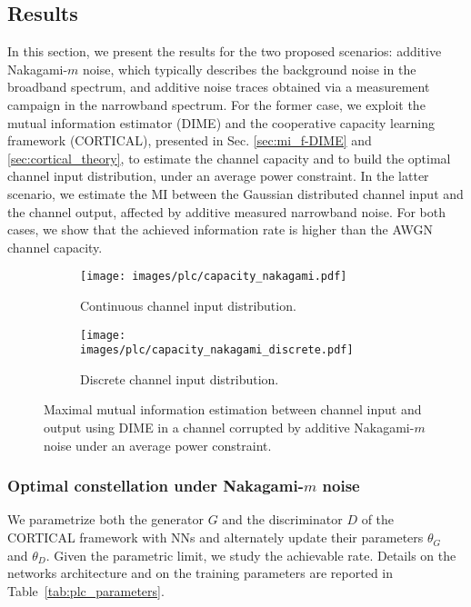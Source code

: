 \subsection{Results}
\label{subsec:plc_results}
In this section, we present the results for the two proposed scenarios: additive Nakagami-$m$ noise, which typically describes the background noise in the broadband spectrum, and additive noise traces obtained via a measurement campaign in the narrowband spectrum. For the former case, we exploit the mutual information estimator (DIME) and the cooperative capacity learning framework (CORTICAL), presented in Sec. \ref{sec:mi_f-DIME} and \ref{sec:cortical_theory}, to estimate the channel capacity and to build the optimal channel input distribution, under an average power constraint. In the latter scenario, we estimate the MI between the Gaussian distributed channel input and the channel output, affected by additive measured narrowband noise. For both cases, we show that the achieved information rate is higher than the AWGN channel capacity.

\begin{figure}
\begin{subfigure}{0.5\textwidth}
	\centering
	\texttt{[image: images/plc/capacity\_nakagami.pdf]}
	\caption{Continuous channel input distribution.}
	\label{fig:plc_capacity_nakagami}
\end{subfigure}
\begin{subfigure}{0.5\textwidth}
	\centering
	\texttt{[image: images/plc/capacity\_nakagami\_discrete.pdf]}
	\caption{Discrete channel input distribution.}
	\label{fig:plc_capacity_nakagami_discrete}
\end{subfigure}
\caption{Maximal mutual information estimation between channel input and output using DIME in a channel corrupted by additive Nakagami-$m$ noise under an average power constraint.}
\end{figure} 

\subsubsection{Optimal constellation under Nakagami-$m$ noise}
\label{subsec:plc_optimal_constellation}
We parametrize both the generator $G$ and the discriminator $D$ of the CORTICAL framework with NNs and alternately update their parameters $\theta_G$ and $\theta_D$. Given the parametric limit, we study the achievable rate. Details on the networks architecture and on the training parameters are reported in Table~\ref{tab:plc_parameters}.

